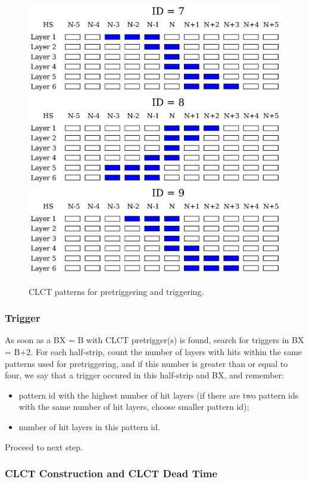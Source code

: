 \begin{figure}[tbh]
\begin{center}
                \includegraphics[width=0.48\linewidth]{figures/clct_pattern_07.pdf}\\
                \includegraphics[width=0.48\linewidth]{figures/clct_pattern_08.pdf}
                \includegraphics[width=0.48\linewidth]{figures/clct_pattern_09.pdf}
                \caption{CLCT patterns for pretriggering and triggering.}
                \label{fig:clct_pretrigger}
        \end{center}
\end{figure}

\subsubsection{Trigger}

As soon as a BX = B with CLCT pretrigger(s) is found, search for triggers in BX = B+2. For each half-strip, count the number of layers with hits within the same patterns used for pretriggering, and if this number is greater than or equal to four, we say that a trigger occured in this half-strip and BX, and remember:
\begin{itemize}
    \item pattern id with the highest number of hit layers (if there are two pattern ids with the same number of hit layers, choose smaller pattern id);
    \item number of hit layers in this pattern id.
\end{itemize}

Proceed to next step.

\subsubsection{CLCT Construction and CLCT Dead Time}

